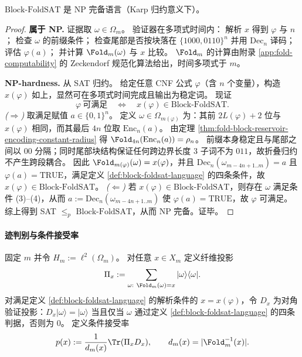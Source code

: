 \begin{theorem}\label{thm:block-foldsat-np-complete}
\(\mathrm{Block}\text{-}\mathrm{FoldSAT}\) 是 NP 完备语言（Karp 归约意义下）。
\end{theorem}

\begin{proof}
\textbf{属于 NP.}
证据取 \(\omega\in\Omega_m\)。
验证器在多项式时间内：
解析 \(x\) 得到 \(\varphi\) 与 \(n\)；
检查 \(\omega\) 的前缀条件；
检查尾部是否按块落在 \(\{1000,0110\}^n\) 并用 \(\mathrm{Dec}_n\) 译码；
评估 \(\varphi(a)\)；
并计算 \(\Fold_m(\omega)\) 与 \(x\) 比较。
\(\Fold_m\) 的计算由附录 \ref{app:fold-computability} 的 Zeckendorf 规范化算法给出，时间多项式于 \(m\)。
\par
\textbf{NP-hardness.}
从 SAT 归约。
给定任意 CNF 公式 \(\varphi\)（含 \(n\) 个变量），构造 \(x(\varphi)\) 如上，显然可在多项式时间完成且输出为稳定词。
现证
\[
\varphi\ \text{可满足}
\quad\Longleftrightarrow\quad
x(\varphi)\in \mathrm{Block}\text{-}\mathrm{FoldSAT}.
\]
\emph{(\(\Rightarrow\))}
取满足赋值 \(a\in\{0,1\}^n\)。
定义 \(\omega\in\Omega_{m(\varphi)}\) 为：其前 \(2L(\varphi)+2\) 位与 \(x(\varphi)\) 相同，而其最后 \(4n\) 位取 \(\mathrm{Enc}_n(a)\)。
由定理 \ref{thm:fold-block-reservoir-encoding-constant-radius} 得 \(\Fold_{4n}(\mathrm{Enc}_n(a))=\rho_n\)。
前缀本身稳定且与尾部之间以 \(00\) 分隔；同时尾部块结构保证任何跨边界长度 \(3\) 子词不为 \(011\)，故折叠归约不产生跨段耦合。
因此 \(\Fold_{m(\varphi)}(\omega)=x(\varphi)\)，并且 \(\mathrm{Dec}_n(\omega_{m-4n+1..m})=a\) 且 \(\varphi(a)=\mathrm{TRUE}\)，满足定义 \ref{def:block-foldsat-language} 的四条条件，故 \(x(\varphi)\in \mathrm{Block}\text{-}\mathrm{FoldSAT}\)。
\emph{(\(\Leftarrow\))}
若 \(x(\varphi)\in \mathrm{Block}\text{-}\mathrm{FoldSAT}\)，则存在 \(\omega\) 满足条件 (3)--(4)，从而 \(a:=\mathrm{Dec}_n(\omega_{m-4n+1..m})\) 使 \(\varphi(a)=\mathrm{TRUE}\)，故 \(\varphi\) 可满足。
综上得到 SAT \(\le_p\) \(\mathrm{Block}\text{-}\mathrm{FoldSAT}\)，从而 NP 完备。证毕。
\end{proof}

\paragraph{迹判别与条件接受率}
固定 \(m\) 并令 \(H_m:=\ell^2(\Omega_m)\)。
对任意 \(x\in X_m\) 定义纤维投影
\[
\Pi_x:=\sum_{\omega:\ \Fold_m(\omega)=x}|\omega\rangle\langle\omega|.
\]
对满足定义 \ref{def:block-foldsat-language} 的解析条件的 \(x=x(\varphi)\)，令 \(D_x\) 为对角验证投影：\(D_x|\omega\rangle=|\omega\rangle\) 当且仅当 \(\omega\) 通过定义 \ref{def:block-foldsat-language} 的四条判据，否则为 \(0\)。
定义条件接受率
\[
p(x):=\frac{1}{d_m(x)}\Tr(\Pi_xD_x),
\qquad d_m(x)=|\Fold_m^{-1}(x)|.
\]

